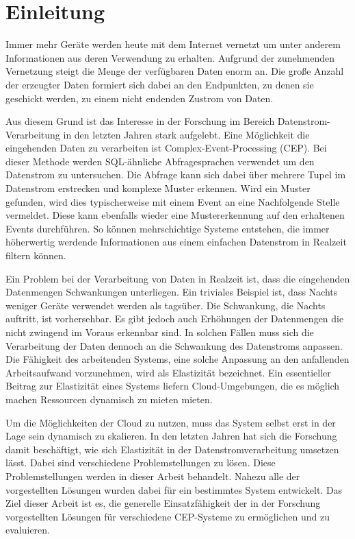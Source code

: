 
\chapter{Einleitung}

Immer mehr Geräte werden heute mit dem Internet vernetzt um unter anderem Informationen aus deren Verwendung zu erhalten.
Aufgrund der zunehmenden Vernetzung steigt die Menge der verfügbaren Daten enorm an.
Die große Anzahl der erzeugter Daten formiert sich dabei an den Endpunkten, zu denen sie geschickt werden, zu einem nicht endenden Zustrom von Daten.

Aus diesem Grund ist das Interesse in der Forschung im Bereich Datenstrom-Verarbeitung in den letzten Jahren stark aufgelebt.
Eine Möglichkeit die eingehenden Daten zu verarbeiten ist Complex-Event-Processing (CEP).
Bei dieser Methode werden SQL-ähnliche Abfragesprachen verwendet um den Datenstrom zu untersuchen.
Die Abfrage kann sich dabei über mehrere Tupel im Datenstrom erstrecken und komplexe Muster erkennen.
Wird ein Muster gefunden, wird dies typischerweise mit einem Event an eine Nachfolgende Stelle vermeldet.
Diese kann ebenfalls wieder eine Mustererkennung auf den erhaltenen Events durchführen.
So können mehrschichtige Systeme entstehen, die immer höherwertig werdende Informationen aus einem einfachen Datenstrom in Realzeit filtern können.

Ein Problem bei der Verarbeitung von Daten in Realzeit ist, dass die eingehenden Datenmengen Schwankungen unterliegen.
Ein triviales Beispiel ist, dass Nachts weniger Geräte verwendet werden als tagsüber.
Die Schwankung, die Nachts auftritt, ist vorhersehbar.
Es gibt jedoch auch Erhöhungen der Datenmengen die nicht zwingend im Voraus erkennbar sind.
In solchen Fällen muss sich die Verarbeitung der Daten dennoch an die Schwankung des Datenstroms anpassen.
Die Fähigkeit des arbeitenden Systems, eine solche Anpassung an den anfallenden Arbeitsaufwand vorzunehmen, wird als Elastizität bezeichnet.
Ein essentieller Beitrag zur Elastizität eines Systems liefern Cloud-Umgebungen, die es möglich machen Ressourcen dynamisch zu mieten mieten.

Um die Möglichkeiten der Cloud zu nutzen, muss das System selbst erst in der Lage sein dynamisch zu skalieren.
In den letzten Jahren hat sich die Forschung damit beschäftigt, wie sich Elastizität in der Datenstromverarbeitung umsetzen lässt.
Dabei sind verschiedene Problemstellungen zu lösen.
Diese Problemstellungen werden in dieser Arbeit behandelt.
Nahezu alle der vorgestellten Lösungen wurden dabei für ein bestimmtes System entwickelt.
Das Ziel dieser Arbeit ist es, die generelle Einsatzfähigkeit der in der Forschung vorgestellten Lösungen für verschiedene CEP-Systeme zu ermöglichen und zu evaluieren.

